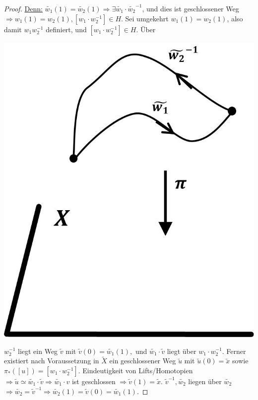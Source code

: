 \documentclass[a4paper,11pt,notitlepage]{report}
\theoremstyle{definition}
\begin{document}
\begin{proof}
	\underline{Denn:} $\widetilde{w_1}(1) = \widetilde{w_2}(1) \Rightarrow \exists \widetilde{w_1} \cdot \widetilde{w_2}^{-1}$, und dies ist geschlossener Weg $\Rightarrow w_1(1) = w_2(1), [w_1 \cdot w_2^{-1}] \in H$.
	\newline
	Sei umgekehrt $w_1(1)=w_2(1)$, also damit $w_1 w_2^{-1}$ definiert, und $[w_1 \cdot w_2^{-1}] \in H$. Über \begin{center}
	 	\includegraphics[scale=0.5]{images/2011_12_20_Bild4.jpg}
	 \end{center} $w_2^{-1}$ liegt ein Weg $\widetilde{v}$ mit $\widetilde{v}(0) = \widetilde{w_1}(1),$ und $\widetilde{w_1} \cdot \widetilde{v}$ liegt über $w_1 \cdot w_2^{-1}$.
	\newline
	Ferner existiert nach Voraussetzung in $\widetilde{X}$ ein geschlossener Weg $\widetilde{u}$ mit $\widetilde{u}(0) = \widetilde{x}$ sowie $\pi_*([u]) = [w_1 \cdot w_2^{-1}]$. Eindeutigkeit von Lifts/Homotopien $\Rightarrow \widetilde{u} \simeq \widetilde{w_1} \cdot \widetilde{v} \Rightarrow \widetilde{w_1} \cdot v$ ist geschlossen $\Rightarrow \widetilde{v}(1) = \widetilde{x}$.
	\newline
	$\widetilde{v}^{-1}, \widetilde{w_2}$ liegen über $\widetilde{w_2}$ $\Rightarrow \widetilde{w_2} = \widetilde{v}^{-1} \Rightarrow \widetilde{w_2}(1) = \widetilde{v}(0) = \widetilde{w_1}(1)$.
\end{proof}
\end{document}
